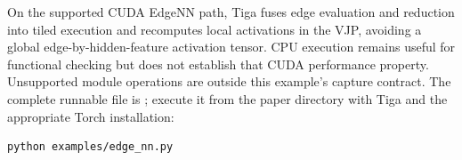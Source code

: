 On the supported CUDA EdgeNN path, Tiga fuses edge evaluation and reduction
into tiled execution and recomputes local activations in the VJP, avoiding
a global edge-by-hidden-feature activation tensor. CPU execution remains
useful for functional checking but does not establish that CUDA performance
property. Unsupported module operations are outside this example's capture
contract. The complete runnable file is
\href{https://github.com/walkerchi/tiga-lang-paper/blob/main/examples/edge_nn.py}{}; execute it
from the paper directory with Tiga and the appropriate Torch installation:
\begin{lstlisting}[language=TigaShell]
python examples/edge_nn.py
\end{lstlisting}
